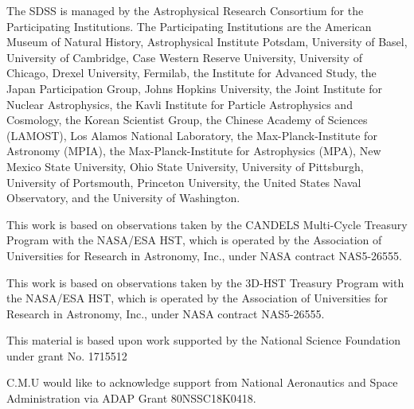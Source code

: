 The SDSS is managed by the Astrophysical Research Consortium for the Participating Institutions. The Participating Institutions are the American Museum of Natural History, Astrophysical Institute Potsdam, University of Basel, University of Cambridge, Case Western Reserve University, University of Chicago, Drexel University, Fermilab, the Institute for Advanced Study, the Japan Participation Group, Johns Hopkins University, the Joint Institute for Nuclear Astrophysics, the Kavli Institute for Particle Astrophysics and Cosmology, the Korean Scientist Group, the Chinese Academy of Sciences (LAMOST), Los Alamos National Laboratory, the Max-Planck-Institute for Astronomy (MPIA), the Max-Planck-Institute for Astrophysics (MPA), New Mexico State University, Ohio State University, University of Pittsburgh, University of Portsmouth, Princeton University, the United States Naval Observatory, and the University of Washington.

This work is based on observations taken by the CANDELS Multi-Cycle Treasury Program with the NASA/ESA HST, which is operated by the Association of Universities for Research in Astronomy, Inc., under NASA contract NAS5-26555.

This work is based on observations taken by the 3D-HST Treasury Program with the NASA/ESA HST, which is operated by the Association of Universities for Research in Astronomy, Inc., under NASA contract NAS5-26555.

This material is based upon work supported by the National Science Foundation under grant No. 1715512

C.M.U would like to acknowledge support from National Aeronautics and Space Administration via ADAP Grant 80NSSC18K0418. 
